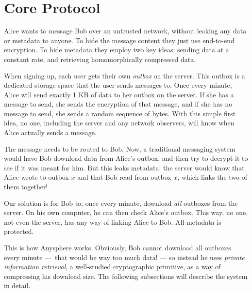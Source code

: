 \section{Core Protocol}
\label{sec:coreprotocol}

 Alice wants to message Bob over an untrusted network, without leaking any data or metadata to anyone. To hide the message content they just use end-to-end encryption. To hide metadata they employ two key ideas: sending data at a constant rate, and retrieving homomorphically compressed data.

When signing up, each user gets their own \textit{outbox} on the server. This outbox is a dedicated storage space that the user sends messages to. Once every minute, Alice will send exactly 1 KB of data to her outbox on the server. If she has a message to send, she sends the  encryption of that message, and if she has no message to send, she sends a random sequence of bytes. With this simple first idea, no one, including the server and any network observers, will know when Alice actually sends a message.

The message needs to be routed to Bob. Now, a traditional messaging system would have Bob download data from Alice's outbox, and then try to decrypt it to see if it was meant for him. But this leaks metadata: the server would know that Alice wrote to outbox $x$ and that Bob read from outbox $x$, which links the two of them together!

Our solution is for Bob to, once every minute, download \textit{all} outboxes from the server. On his own computer, he can then check Alice's outbox. This way, no one, not even the server, has any way of linking Alice to Bob. All metadata is protected.

This is how Anysphere works. Obviously, Bob cannot download all outboxes every minute — that would be way too much data! — so instead he uses \textit{private information retrieval}, a well-studied cryptographic primitive, as a way of compressing his download size. The following subsections will describe the system in detail.

